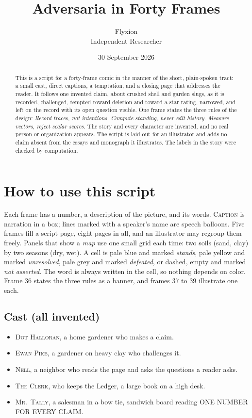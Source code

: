\documentclass[11pt]{article}
\title{Adversaria in Forty Frames}
\author{Flyxion\\\small Independent Researcher}
\date{30 September 2026}
\newcommand{\nm}[1]{\textsc{#1}}
\begin{document}
\maketitle

\begin{abstract}
\noindent
This is a script for a forty-frame comic in the manner of the short, plain-spoken tract: a small cast, direct captions, a temptation, and a closing page that addresses the reader. It follows one invented claim, about crushed shell and garden slugs, as it is recorded, challenged, tempted toward deletion and toward a star rating, narrowed, and left on the record with its open question visible. One frame states the three rules of the design: \emph{Record traces, not intentions. Compute standing, never edit history. Measure vectors, reject scalar scores.} The story and every character are invented, and no real person or organization appears. The script is laid out for an illustrator and adds no claim absent from the essays and monograph it illustrates. The labels in the story were checked by computation.
\end{abstract}

\section{How to use this script}

Each frame has a number, a description of the picture, and its words. \textsc{Caption} is narration in a box; lines marked with a speaker's name are speech balloons. Five frames fill a script page, eight pages in all, and an illustrator may regroup them freely. Panels that show a \emph{map} use one small grid each time: two soils (sand, clay) by two seasons (dry, wet). A cell is pale blue and marked \emph{stands}, pale yellow and marked \emph{unresolved}, pale grey and marked \emph{defeated}, or dashed, empty and marked \emph{not asserted}. The word is always written in the cell, so nothing depends on color. Frame 36 states the three rules as a banner, and frames 37 to 39 illustrate one each.

\subsection*{Cast (all invented)}

\begin{itemize}[nosep]
\item \nm{Dot Halloran}, a home gardener who makes a claim.
\item \nm{Ewan Pike}, a gardener on heavy clay who challenges it.
\item \nm{Nell}, a neighbor who reads the page and asks the questions a reader asks.
\item \nm{The Clerk}, who keeps the Ledger, a large book on a high desk.
\item \nm{Mr.\ Tally}, a salesman in a bow tie, sandwich board reading ONE NUMBER FOR EVERY CLAIM.
\end{itemize}
\end{document}
